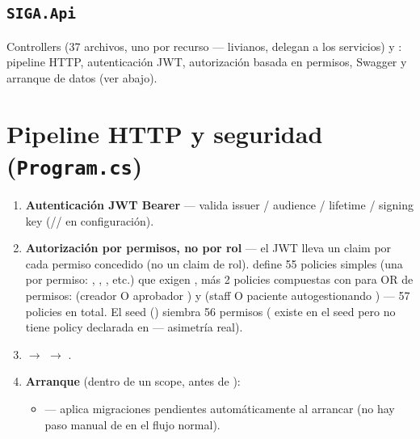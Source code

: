 \subsection{\texttt{SIGA.Api}}
Controllers (37 archivos, uno por recurso --- livianos, delegan a los servicios) y : pipeline HTTP, autenticación JWT, autorización basada en permisos, Swagger y arranque de datos (ver abajo).

\section{Pipeline HTTP y seguridad (\texttt{Program.cs})}
\label{sec:arch-pipeline}

\begin{enumerate}
  \item \textbf{Autenticación JWT Bearer} --- \allowbreak {}\allowbreak {} valida issuer / audience / lifetime / signing key (/\allowbreak {}/\allowbreak {} en configuración).
  \item \textbf{Autorización por permisos, no por rol} --- el JWT lleva un claim  por cada permiso concedido (no un claim de rol).  define 55 policies simples (una por permiso: , , \allowbreak {}, etc.) que exigen , más 2 policies compuestas con  para OR de permisos:  (creador  O aprobador ) y  (staff  O paciente autogestionando ) --- 57 policies en total. El seed (\allowbreak {}) siembra 56 permisos ( existe en el seed pero no tiene policy declarada en  --- asimetría real).
  \item {}\allowbreak {} $\rightarrow$ \allowbreak {} $\rightarrow$ \allowbreak {}.
  \item \textbf{Arranque} (dentro de un scope, antes de ):
  \begin{itemize}
    \item {}\allowbreak {}\allowbreak {} --- aplica migraciones pendientes automáticamente al arrancar (no hay paso manual de  en el flujo normal).

\end{itemize}
\end{enumerate}
